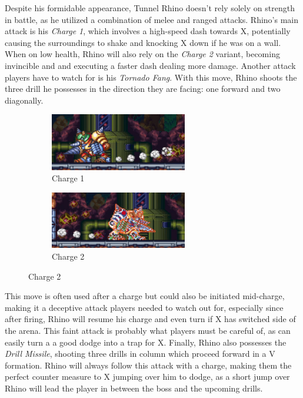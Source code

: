 Despite his formidable appearance, Tunnel Rhino doesn't rely solely on strength in battle, as he utilized a combination of melee and ranged attacks. Rhino's main attack is his \emph{Charge 1}, which involves  a high-speed dash towards X, potentially causing the surroundings to shake and knocking X down if he was on a wall. When on low health, Rhino will also rely on the \emph{Charge 2} variant, becoming invincible and and executing a faster dash dealing more damage. Another attack players have to watch for is his \emph{Tornado Fang}. With this move, Rhino shoots the three drill he possesses in the direction they are facing: one forward and two diagonally. 
\begin{figure}[htp]
	\centering
	\begin{subfigure}{\linewidth}
		\centering
		\includegraphics[height=2.5cm]{figures/X3/Tunnel_rhino/rhyno_dash.jpg}
		\caption{Charge 1}
	\end{subfigure}
	\begin{subfigure}{\linewidth}
		\centering
		\includegraphics[height=2.5cm]{figures/X3/Tunnel_rhino/rhyno_dm.jpg}
		\caption{Charge 2}
	\end{subfigure}
\end{figure}This move is often used after a charge but could also be initiated mid-charge, making it a deceptive attack players needed to watch out for, especially since after firing, Rhino will resume his charge and even turn if X has switched side of the arena. This faint attack is probably what players must be careful of, as can easily turn a a good dodge into a trap for X. Finally, Rhino also possesses the \emph{Drill Missile}, shooting three drills in column which proceed forward in a V formation. Rhino will always follow this attack with a charge, making them the perfect counter measure to X jumping over him to dodge, as a short jump over Rhino will lead the player in between the boss and the upcoming drills.

